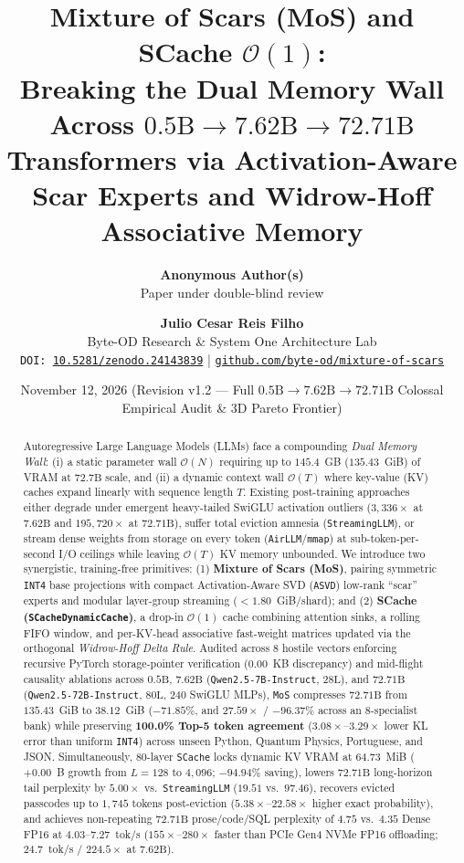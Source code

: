 \documentclass[10pt,twocolumn]{article}
\title{\textbf{Mixture of Scars (MoS) and SCache $\mathcal{O}(1)$:\\Breaking the Dual Memory Wall Across $0.5\text{B} \to 7.62\text{B} \to 72.71\text{B}$ Transformers via Activation-Aware Scar Experts and Widrow-Hoff Associative Memory}}
\author{
  \textbf{Anonymous Author(s)}\\
  Paper under double-blind review
}
\author{
  \textbf{Julio Cesar Reis Filho}\\
  Byte-OD Research \& System One Architecture Lab\\
  \texttt{DOI: \href{https://doi.org/10.5281/zenodo.24143839}{10.5281/zenodo.24143839}} \quad|\quad
  \texttt{\href{https://github.com/byte-od/mixture-of-scars}{github.com/byte-od/mixture-of-scars}}
}
\date{November 12, 2026 \quad (Revision v1.2 --- Full $0.5\text{B} \to 7.62\text{B} \to 72.71\text{B}$ Colossal Empirical Audit \& 3D Pareto Frontier)}
\begin{document}
\maketitle

\begin{abstract}
Autoregressive Large Language Models (LLMs) face a compounding \emph{Dual Memory Wall}: (i) a static parameter wall $\mathcal{O}(N)$ requiring up to $145.4$~GB ($135.43$~GiB) of VRAM at $72.7\text{B}$ scale, and (ii) a dynamic context wall $\mathcal{O}(T)$ where key-value (KV) caches expand linearly with sequence length $T$. Existing post-training approaches either degrade under emergent heavy-tailed SwiGLU activation outliers ($3{,}336\times$ at $7.62\text{B}$ and $195{,}720\times$ at $72.71\text{B}$), suffer total eviction amnesia (\texttt{StreamingLLM}), or stream dense weights from storage on every token (\texttt{AirLLM}/\texttt{mmap}) at sub-token-per-second I/O ceilings while leaving $\mathcal{O}(T)$ KV memory unbounded. We introduce two synergistic, training-free primitives: (1) \textbf{Mixture of Scars (MoS)}, pairing symmetric \texttt{INT4} base projections with compact Activation-Aware SVD (\texttt{ASVD}) low-rank ``scar'' experts and modular layer-group streaming ($<1.80$~GiB/shard); and (2) \textbf{SCache (\texttt{SCacheDynamicCache})}, a drop-in $\mathcal{O}(1)$ cache combining attention sinks, a rolling FIFO window, and per-KV-head associative fast-weight matrices updated via the orthogonal \emph{Widrow-Hoff Delta Rule}. Audited across 8 hostile vectors enforcing recursive PyTorch storage-pointer verification ($0.00$~KB discrepancy) and mid-flight causality ablations across $0.5\text{B}$, $7.62\text{B}$ (\texttt{Qwen2.5-7B-Instruct}, $28\text{L}$), and $72.71\text{B}$ (\texttt{Qwen2.5-72B-Instruct}, $80\text{L}$, $240$ SwiGLU MLPs), \texttt{MoS} compresses $72.71\text{B}$ from $135.43$~GiB to $38.12$~GiB ($-71.85\%$, and $27.59\times$ / $-96.37\%$ across an 8-specialist bank) while preserving \textbf{100.0\% Top-5 token agreement} ($3.08\times$--$3.29\times$ lower KL error than uniform \texttt{INT4}) across unseen Python, Quantum Physics, Portuguese, and JSON. Simultaneously, 80-layer \texttt{SCache} locks dynamic KV VRAM at $64.73$~MiB ($+0.00$~B growth from $L=128$ to $4{,}096$; $-94.94\%$ saving), lowers $72.71\text{B}$ long-horizon tail perplexity by $5.00\times$ vs.\ \texttt{StreamingLLM} ($19.51$ vs.\ $97.46$), recovers evicted passcodes up to $1{,}745$ tokens post-eviction ($5.38\times$--$22.58\times$ higher exact probability), and achieves non-repeating $72.71\text{B}$ prose/code/SQL perplexity of $\mathbf{4.75}$ vs.\ $\mathbf{4.35}$ Dense FP16 at $4.03$--$7.27$~tok/s ($155\times$--$280\times$ faster than PCIe Gen4 NVMe FP16 offloading; $24.7$~tok/s / $224.5\times$ at $7.62\text{B}$).
\end{abstract}
\end{document}

